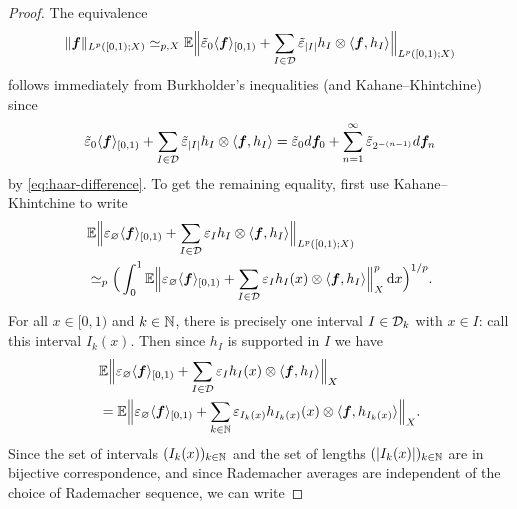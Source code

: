 \begin{proof}
  The equivalence
    \begin{equation*}
    \|\bm{f}\|_{L^p([0,1);X)}
    \simeq_{p,X} \mathbb{E} \Big\|  \tilde{\varepsilon}_{0} \langle \bm{f} \rangle_{[0,1)} + \sum_{I \in \mathcal{D}} \tilde{\varepsilon}_{|I|} h_{I} \otimes \langle \bm{f}, h_{I} \rangle \Big\|_{L^p([0,1);X)}
  \end{equation*}
  follows immediately from Burkholder's inequalities (and Kahane--Khintchine) since
  \begin{equation*}
     \tilde{\varepsilon}_{0} \langle \bm{f} \rangle_{[0,1)} + \sum_{I \in \mathcal{D}} \tilde{\varepsilon}_{|I|} h_{I} \otimes \langle \bm{f}, h_{I} \rangle
    = \tilde{\varepsilon}_{0} d\bm{f}_{0} + \sum_{n = 1}^{\infty} \tilde{\varepsilon}_{2^{-(n-1)}} d\bm{f}_{n}
  \end{equation*}
  by \eqref{eq:haar-difference}.
  To get the remaining equality, first use Kahane--Khintchine to write
  \begin{equation}\label{eq:haar-sqfn-kk}
    \begin{aligned}
      &\mathbb{E} \Big\| \varepsilon_{\varnothing} \langle \bm{f} \rangle_{[0,1)} + \sum_{I \in \mathcal{D}} \varepsilon_{I} h_{I} \otimes \langle \bm{f}, h_{I} \rangle \Big\|_{L^p([0,1);X)} \\
      &\simeq_{p} \Big( \int_{0}^{1} \mathbb{E} \Big\| \varepsilon_{\varnothing} \langle \bm{f} \rangle_{[0,1)} + \sum_{I \in \mathcal{D}} \varepsilon_{I} h_{I}(x) \otimes \langle \bm{f}, h_{I} \rangle \Big\|_{X}^{p} \, \mathrm{d} x\Big)^{1/p}.
  \end{aligned}
  \end{equation}
  For all $x \in [0,1)$ and $k \in \mathbb{N}$, there is precisely one interval $I \in \mathcal{D}_{k}$ with $x \in I$: call this interval $I_{k}(x)$.
  Then since $h_{I}$ is supported in $I$ we have
  \begin{equation*}
    \begin{aligned}
    &\mathbb{E} \Big\|  \varepsilon_{\varnothing} \langle \bm{f} \rangle_{[0,1)} + \sum_{I \in \mathcal{D}} \varepsilon_{I} h_{I}(x) \otimes \langle \bm{f}, h_{I} \rangle \Big\|_{X} \\
    &= \mathbb{E} \Big\|  \varepsilon_{\varnothing} \langle \bm{f} \rangle_{[0,1)} + \sum_{k \in \mathbb{N}} \varepsilon_{I_{k}(x)} h_{I_{k}(x)}(x) \otimes \langle \bm{f}, h_{I_{k}(x)} \rangle \Big\|_{X}.
  \end{aligned}
  \end{equation*}
  Since the set of intervals $(I_{k}(x))_{k \in \mathbb{N}}$ and the set of lengths $(|I_{k}(x)|)_{k \in \mathbb{N}}$ are in bijective correspondence, and since Rademacher averages are independent of the choice of Rademacher sequence, we can write

\end{proof}
